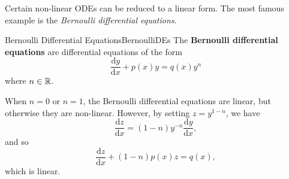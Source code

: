 \documentclass[math, code]{amznotes}
\theoremstyle{remark}
\renewcommand{\d}{\mathrm{d}}
\begin{document}
Certain non-linear ODEs can be reduced to a linear form. The most famous example is the \textit{Bernoulli differential equations}.
\begin{dfnbox}{Bernoulli Differential Equations}{BernoulliDEs}
    The {\color{red} \textbf{Bernoulli differential equations}} are differential equations of the form 
    \begin{equation*}
        \frac{\d y}{\d x} + p(x)y = q(x)y^n
    \end{equation*}
    where $n \in \mathbb{R}$.
\end{dfnbox}
When $n = 0$ or $n = 1$, the Bernoulli differential equations are linear, but otherwise they are non-linear. However, by setting $z = y^{1 - n}$, we have 
\begin{equation*}
    \frac{\d z}{\d x} = (1 - n)y^{-n}\frac{\d y}{\d x},
\end{equation*}
and so 
\begin{equation*}
    \frac{\d z}{\d x} + (1 - n)p(x)z = q(x),
\end{equation*}
which is linear.
\end{document}
